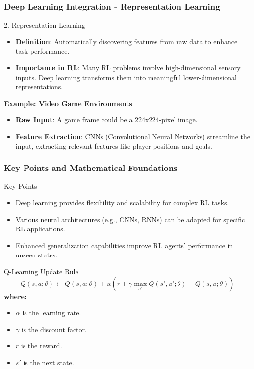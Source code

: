 \documentclass[aspectratio=169]{beamer}
\begin{document}
\begin{frame}[fragile]
    \frametitle{Deep Learning Integration - Representation Learning}
    \begin{block}{2. Representation Learning}
        \begin{itemize}
            \item \textbf{Definition}: Automatically discovering features from raw data to enhance task performance.
            \item \textbf{Importance in RL}: Many RL problems involve high-dimensional sensory inputs. Deep learning transforms them into meaningful lower-dimensional representations.
        \end{itemize}
    \end{block}

    \textbf{Example: Video Game Environments} \\
    \begin{itemize}
        \item \textbf{Raw Input}: A game frame could be a 224x224-pixel image.
        \item \textbf{Feature Extraction}: CNNs (Convolutional Neural Networks) streamline the input, extracting relevant features like player positions and goals.
    \end{itemize}
\end{frame}

\begin{frame}[fragile]
    \frametitle{Key Points and Mathematical Foundations}
    \begin{block}{Key Points}
        \begin{itemize}
            \item Deep learning provides flexibility and scalability for complex RL tasks.
            \item Various neural architectures (e.g., CNNs, RNNs) can be adapted for specific RL applications.
            \item Enhanced generalization capabilities improve RL agents' performance in unseen states.
        \end{itemize}
    \end{block}

    \begin{block}{Q-Learning Update Rule}
        \begin{equation}
            Q(s, a; \theta) \gets Q(s, a; \theta) + \alpha \left( r + \gamma \max_{a'} Q(s', a'; \theta) - Q(s, a; \theta) \right)
        \end{equation}
        \textbf{where:} 
        \begin{itemize}
            \item $\alpha$ is the learning rate.
            \item $\gamma$ is the discount factor.
            \item $r$ is the reward.
            \item $s'$ is the next state.
        \end{itemize}
    \end{block}
\end{frame}
\end{document}
